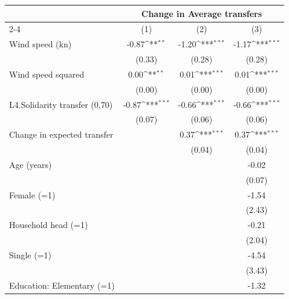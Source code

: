 {
\def\sym#1{\ifmmode^{#1}\else\(^{#1}\)\fi}
\begin{tabular}{l*{3}{c}}
\toprule
                    &\multicolumn{3}{c}{Change in Average transfers}                  \\\cmidrule(lr){2-4}
                    &\multicolumn{1}{c}{(1)}         &\multicolumn{1}{c}{(2)}         &\multicolumn{1}{c}{(3)}         \\
\midrule
Wind speed (kn)     &       -0.87\sym{**} &       -1.20\sym{***}&       -1.17\sym{***}\\
                    &      (0.33)         &      (0.28)         &      (0.28)         \\
Wind speed squared  &        0.00\sym{**} &        0.01\sym{***}&        0.01\sym{***}\\
                    &      (0.00)         &      (0.00)         &      (0.00)         \\
L4.Solidarity transfer (0,70)&       -0.87\sym{***}&       -0.66\sym{***}&       -0.66\sym{***}\\
                    &      (0.07)         &      (0.06)         &      (0.06)         \\
Change in expected transfer&                     &        0.37\sym{***}&        0.37\sym{***}\\
                    &                     &      (0.04)         &      (0.04)         \\
Age (years)         &                     &                     &       -0.02         \\
                    &                     &                     &      (0.07)         \\
Female (=1)         &                     &                     &       -1.54         \\
                    &                     &                     &      (2.43)         \\
Household head (=1) &                     &                     &       -0.21         \\
                    &                     &                     &      (2.04)         \\
Single (=1)         &                     &                     &       -4.54         \\
                    &                     &                     &      (3.43)         \\
Education: Elementary (=1)&                     &                     &       -1.32         \\

\end{tabular}}
